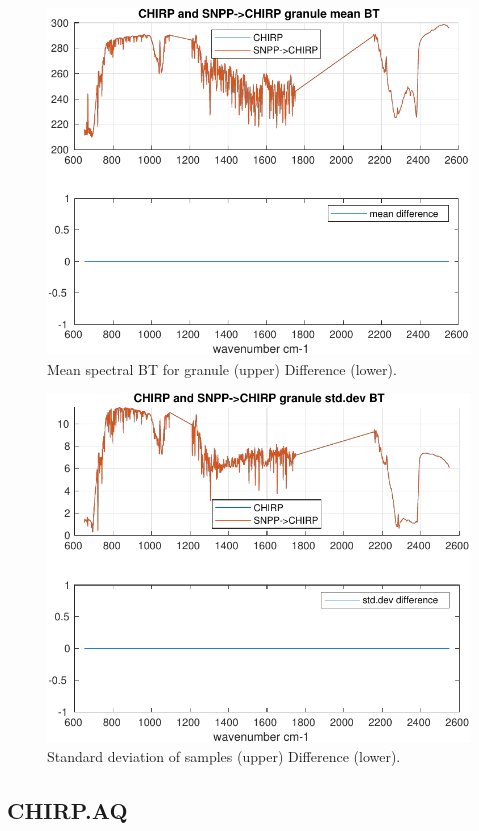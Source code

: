 \documentclass[11pt]{article}
\begin{document}
\begin{figure}[htbp]
\centering
\includegraphics[width=.9\linewidth]{./figs/2020d001g238_bt_spectrum_mean.pdf}
\caption{\label{fig:org307d829}
Mean spectral BT for granule (upper) Difference (lower).}
\end{figure}

\begin{figure}[htbp]
\centering
\includegraphics[width=.9\linewidth]{./figs/2020d001g238_bt_spectrum_std.pdf}
\caption{\label{fig:org084790a}
Standard deviation of samples (upper) Difference (lower).}
\end{figure}



\subsection{CHIRP.AQ}
\label{sec:orgdc9dda5}
\end{document}
